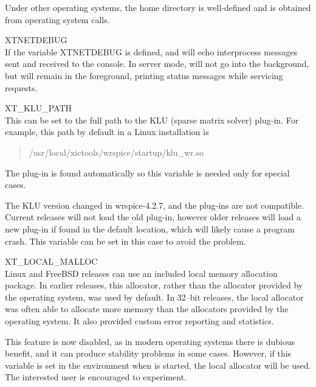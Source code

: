 \begin{description}
Under other operating systems, the home directory is well-defined
and is obtained from operating system calls.

\item{\et XTNETDEBUG}\\
If the variable {\et XTNETDEBUG} is defined, {\Xic} and {\WRspice}
will echo interprocess messages sent and received to the console.  In
server mode, {\Xic} will not go into the background, but will remain
in the foreground, printing status messages while servicing requests.

\item{\et XT\_KLU\_PATH}\\
This can be set to the full path to the KLU (sparse matrix solver)
plug-in.  For example, this path by default in a Linux installation is
\begin{quote}\vt
/usr/local/xictools/wrspice/startup/klu\_wr.so
\end{quote}
The plug-in is found automatically so this variable is needed only for
special cases. 

The KLU version changed in wrspice-4.2.7, and the plug-ins are not
compatible.  Current {\WRspice} releases will not load the old
plug-in, however older releases will load a new plug-in if found in
the default location, which will likely cause a program crash.  This
variable can be set in this case to avoid the problem.

\item{\et XT\_LOCAL\_MALLOC}\\
Linux and FreeBSD releases can use an included local memory allocation
package.  In earlier {\WRspice} releases, this allocator, rather than
the allocator provided by the operating system, was used by default. 
In 32--bit releases, the local allocator was often able to allocate
more memory than the allocators provided by the operating system.  It
also provided custom error reporting and statistics.

This feature is now disabled, as in modern operating systems there is
dubious benefit, and it can produce stability problems in some cases. 
However, if this variable is set in the environment when {\WRspice} is
started, the local allocator will be used.  The interested user is
encouraged to experiment.


\end{description}
